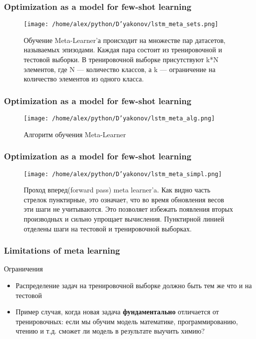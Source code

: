 \documentclass[fleqn, xcolor=x11names]{beamer}
\begin{document}
\begin{frame}\frametitle{Optimization as a model for few-shot learning}
\begin{figure}[h]
\begin{center}
\texttt{[image: /home/alex/python/D'yakonov/lstm\_meta\_sets.png]}
\caption{{\footnotesize Обучение Meta-Learner'а происходит на множестве пар датасетов, называемых эпизодами. Каждая пара состоит из тренировочной и тестовой выборки. В тренировочной выборке присутствуют k*N элементов, где N --- количество классов, а k --- ограничение на количество элементов из одного класса. }}
\end{center}
\end{figure}
\end{frame}

\begin{frame}\frametitle{Optimization as a model for few-shot learning}

\begin{figure}[h]
\begin{center}
\texttt{[image: /home/alex/python/D'yakonov/lstm\_meta\_alg.png]}
\caption{{\footnotesize  Алгоритм обучения Meta-Learner}}
\end{center}
\end{figure}

\end{frame}

\begin{frame}\frametitle{Optimization as a model for few-shot learning}
\begin{figure}[h]
\begin{center}
\texttt{[image: /home/alex/python/D'yakonov/lstm\_meta\_simpl.png]}
\caption{{\footnotesize  Проход вперед(forward pass) meta learner'a. Как видно часть стрелок пунктирные, это означает, что во время обновления весов эти шаги не учитываются. Это позволяет избежать появления вторых производных и сильно упрощает вычисления. Пунктирной линией отделены шаги на тестовой и тренировочной выборках.}}
\end{center}
\end{figure}
\end{frame}

\begin{frame}\frametitle{Limitations of meta learning}
{\footnotesize
\begin{block}{Ограничения}
\begin{itemize}
\item Распределение задач на тренировочной выборке должно быть тем же что и на тестовой
\item Пример случая, когда новая задача \textbf{фундаментально} отличается от тренировочных: если мы обучим модель математике, программированию, чтению и т.д. сможет ли модель в результате выучить химию?

\end{itemize}
\end{block}
}
\end{frame}
\end{document}
